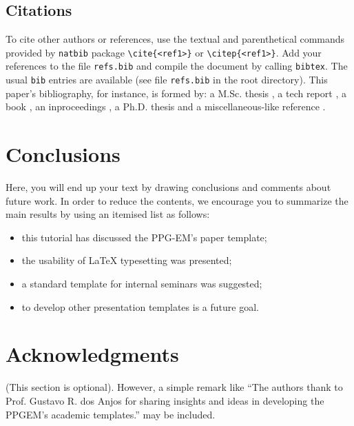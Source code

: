 \documentclass[date]{ppgem}
\begin{document}
\begin{multicols}{2}
\subsection{Citations}

To cite other authors or references, use the textual and parenthetical commands provided by \verb|natbib| package 
\verb|\cite{<ref1>}| or \verb|\citep{<ref1>}|. Add your references to the file \verb|refs.bib| and compile the document by calling \verb|bibtex|.
The usual \verb|bib| entries are available (see file \verb|refs.bib| in the root directory). This paper's bibliography, for instance, is formed by: a M.Sc. thesis \citep{rabellomsc2007}, a tech report \cite{amarante2001}, a book \citep{batchelor1994}, an inproceedings \cite{lima2009}, a Ph.D. thesis \citep{loureirophd2008} and a miscellaneous-like reference \citep{mangiavacchi2000}.

\section{Conclusions}

Here, you will end up your text by drawing conclusions and comments about future work. In order to reduce the contents, we encourage you to summarize the main results by using an itemised list as follows:
\begin{itemize}
\item this tutorial has discussed the PPG-EM's paper template;
\item the usability of {\LaTeX} typesetting was presented;
\item a standard template for internal seminars was suggested;
\item to develop other presentation templates is a future goal. 
\end{itemize}

\section{Acknowledgments}

(This section is optional). However, a simple remark like ``The authors thank to Prof. Gustavo R. dos Anjos for sharing insights and ideas in developing the PPGEM's academic templates.'' 
may be included. 




\end{multicols}
\end{document}
